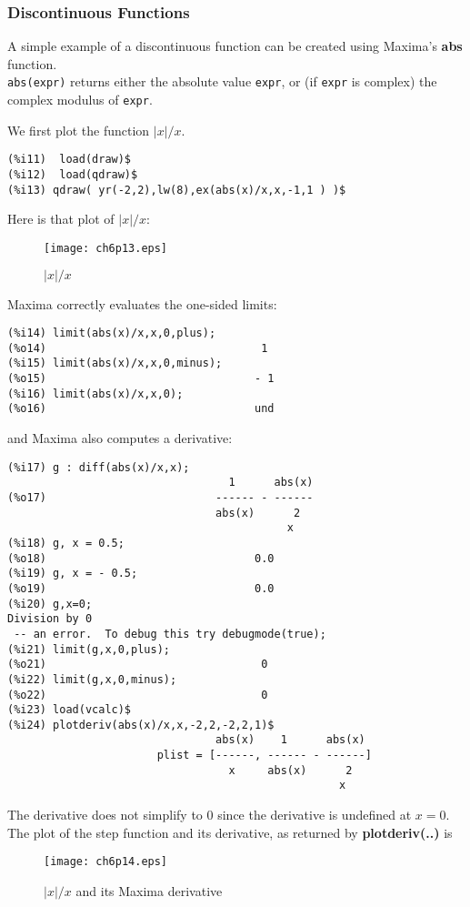 \documentclass[12pt]{article}
\begin{document}
\subsubsection{Discontinuous Functions}
A simple example of a discontinuous function can be created using Maxima's
  \textbf{abs} function.\\
\verb|abs(expr)| returns either the absolute value \verb|expr|,
  or (if \verb|expr| is complex) the complex modulus of \verb|expr|.

\smallskip
We first plot the function $\vert x \vert /x$.  
\small
\begin{verbatim}
(%i11)  load(draw)$
(%i12)  load(qdraw)$
(%i13) qdraw( yr(-2,2),lw(8),ex(abs(x)/x,x,-1,1 ) )$
\end{verbatim}
\normalsize

Here is that plot of $\vert x \vert /x$:
\begin{figure} [h]
   \centerline{\texttt{[image: ch6p13.eps]} }
	\caption{ $\vert x \vert /x$  }
\end{figure} 

\newpage

Maxima correctly evaluates the one-sided limits:
\small
\begin{verbatim}
(%i14) limit(abs(x)/x,x,0,plus);
(%o14)                                 1
(%i15) limit(abs(x)/x,x,0,minus);
(%o15)                                - 1
(%i16) limit(abs(x)/x,x,0);
(%o16)                                und
\end{verbatim}
\normalsize
and Maxima also computes a derivative:
\small
\begin{verbatim}
(%i17) g : diff(abs(x)/x,x);
                                  1      abs(x)
(%o17)                          ------ - ------
                                abs(x)      2
                                           x
(%i18) g, x = 0.5;
(%o18)                                0.0
(%i19) g, x = - 0.5;
(%o19)                                0.0
(%i20) g,x=0;
Division by 0
 -- an error.  To debug this try debugmode(true);
(%i21) limit(g,x,0,plus);
(%o21)                                 0
(%i22) limit(g,x,0,minus);
(%o22)                                 0
(%i23) load(vcalc)$
(%i24) plotderiv(abs(x)/x,x,-2,2,-2,2,1)$
                                abs(x)    1      abs(x)
                       plist = [------, ------ - ------]
                                  x     abs(x)      2
                                                   x
\end{verbatim}
\normalsize
The derivative does not simplify to $0$ since the derivative is
  undefined at $x = 0$.
The plot of the step function and its derivative, as returned
  by \textbf{plotderiv(..)} is
\begin{figure} [h]
   \centerline{\texttt{[image: ch6p14.eps]} }
	\caption{ $\vert x \vert /x$ and its Maxima derivative }
\end{figure} 
\end{document}
